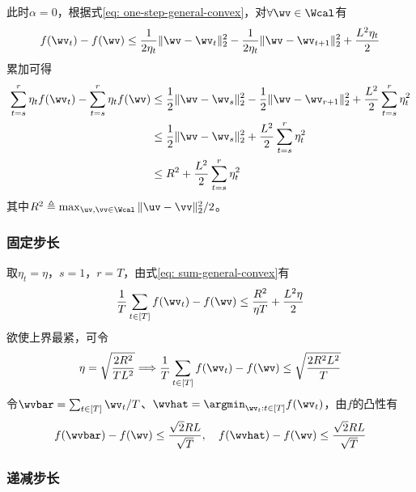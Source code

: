 \documentclass{ctexart}
\begin{document}
此时$\alpha = 0$，根据式\eqref{eq: one-step-general-convex}，对$\forall \wv \in \Wcal$有
\begin{align*}
    f(\wv_t) - f(\wv) \le \frac{1}{2\eta_t} \| \wv - \wv_t \|_2^2 - \frac{1}{2\eta_t} \| \wv - \wv_{t+1} \|_2^2 + \frac{L^2 \eta_t}{2}
\end{align*}
累加可得
\begin{align}
    \sum_{t=s}^r \eta_t f(\wv_t) - \sum_{t=s}^r \eta_t f(\wv)
     & \le \frac{1}{2} \| \wv - \wv_s \|_2^2 - \frac{1}{2} \| \wv - \wv_{r+1} \|_2^2 + \frac{L^2}{2} \sum_{t=s}^r \eta_t^2 \nonumber \\
     & \le \frac{1}{2} \| \wv - \wv_s \|_2^2 + \frac{L^2}{2} \sum_{t=s}^r \eta_t^2 \nonumber                                         \\
    \label{eq: sum-general-convex}
     & \le R^2 + \frac{L^2}{2} \sum_{t=s}^r \eta_t^2
\end{align}
其中$R^2 \triangleq \max_{\uv,\vv \in \Wcal} \|\uv - \vv\|_2^2/2$。

\subsubsection{固定步长}

取$\eta_t = \eta$，$s=1$，$r=T$，由式\eqref{eq: sum-general-convex}有
\begin{align*}
    \frac{1}{T} \sum_{t \in [T]} f(\wv_t) - f(\wv) \le \frac{R^2}{\eta T} + \frac{L^2 \eta}{2}
\end{align*}
欲使上界最紧，可令
\begin{align*}
    \eta = \sqrt{\frac{2 R^2}{T L^2}} \Longrightarrow \frac{1}{T} \sum_{t \in [T]} f(\wv_t) - f(\wv) \le \sqrt{\frac{2 R^2 L^2}{T}}
\end{align*}
令$\wvbar = \sum_{t \in [T]} \wv_t / T$、$\wvhat = \argmin_{\wv_t: t \in [T]} f(\wv_t)$，由$f$的凸性有
\begin{align*}
    f(\wvbar) - f(\wv) \le \frac{\sqrt{2} R L}{\sqrt{T}}, \quad f(\wvhat) - f(\wv) \le \frac{\sqrt{2} R L}{\sqrt{T}}
\end{align*}

\subsubsection{递减步长}
\end{document}
